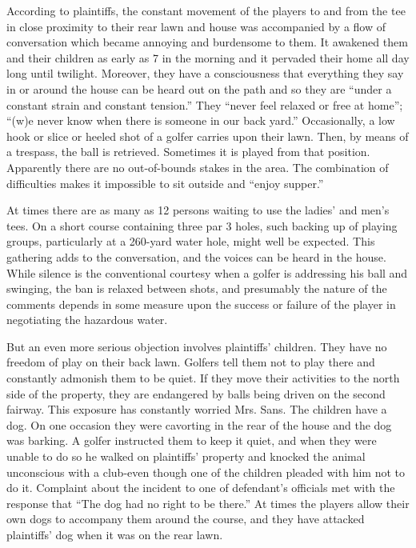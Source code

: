 According to plaintiffs, the constant movement of the players to and from the
tee in close proximity to their rear lawn and house was accompanied by a flow of
conversation which became annoying and burdensome to them. It awakened them and
their children as early as 7 in the morning and it pervaded their home all day
long until twilight. Moreover, they have a consciousness that everything they
say in or around the house can be heard out on the path and so they are ``under
a constant strain and constant tension.'' They ``never feel relaxed or free at
home''; ``(w)e never know when there is someone in our back yard.''
Occasionally, a
low hook or slice or heeled shot of a golfer carries upon their lawn. Then, by
means of a trespass, the ball is retrieved. Sometimes it is played from that
position. Apparently there are no out-of-bounds stakes in the area. The
combination of difficulties makes it impossible to sit outside and ``enjoy
supper.''

At times there are as many as 12 persons waiting to use the ladies' and men's
tees. On a short course containing three par 3 holes, such backing up of playing
groups, particularly at a 260-yard water hole, might well be expected. This
gathering adds to the conversation, and the voices can be heard in the house.
While silence is the conventional courtesy when a golfer is addressing his ball
and swinging, the ban is relaxed between shots, and presumably the nature of the
comments depends in some measure upon the success or failure of the player in
negotiating the hazardous water.

But an even more serious objection involves plaintiffs' children. They have no
freedom of play on their back lawn. Golfers tell them not to play there and
constantly admonish them to be quiet. If they move their activities to the north
side of the property, they are endangered by balls being driven on the second
fairway. This exposure has constantly worried Mrs. Sans. The children have a
dog. On one occasion they were cavorting in the rear of the house and the dog
was barking. A golfer instructed them to keep it quiet, and when they were
unable to do so he walked on plaintiffs' property and knocked the animal
unconscious with a club-even though one of the children pleaded with him not to
do it. Complaint about the incident to one of defendant's officials met with the
response that ``The dog had no right to be there.'' At times the players allow
their own dogs to accompany them around the course, and they have attacked
plaintiffs' dog when it was on the rear lawn.

